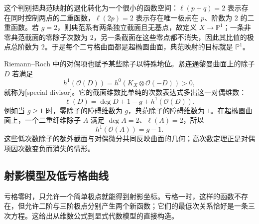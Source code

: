 这个判别把典范映射的退化转化为一个很小的函数空间：\(\ell(p+q)=2\) 表示存在同时控制两点的二重函数，\(\ell(2p)=2\) 表示存在唯一极点在 \(p\)、阶数为 \(2\) 的二重函数。若 \(g=2\)，则典范系有两条独立截面且无基点，故定义 \(X\to\mathbb P^1\)；一条非零典范截面的零除子次数为 \(2\)，另一条截面在这些零点都不消失，因此其比值的极点总阶数为 \(2\)。于是每个二亏格曲面都是超椭圆曲面，典范映射的目标就是 \(\mathbb P^1\)。

\ProseParagraphBreak

Riemann--Roch 中的对偶项也赋予某些除子以特殊地位。紧连通黎曼曲面上的除子 \(D\) 若满足
\[
	h^1(\mathcal O(D))=h^0(K_X\otimes\mathcal O(-D))>0,
\]
就称为[special divisor]。它的截面维数比单纯的次数表达式多出这一对偶维数：
\[
	\ell(D)=\deg D+1-g+h^1(\mathcal O(D)).
\]
例如当 \(g\ge1\) 时，零除子的障碍维数为 \(g\)，典范除子的障碍维数为 \(1\)。在超椭圆曲面上，一个二重纤维除子 \(A\) 满足 \(\deg A=2\)、\(\ell(A)=2\)，所以
\[
	h^1(\mathcal O(A))=g-1.
\]
这些低次数除子的额外截面与对偶微分共同反映曲面的几何；高次数定理正是对偶项因次数变负而消失的情形。

\subsection{射影模型及低亏格曲线}
\label{g4:subsec:0305:04}

亏格零时，只允许一个简单极点就能得到射影坐标。亏格一时，这样的函数不存在，但允许二阶与三阶极点分别产生两个新函数；它们的最低次关系恰好是一条三次方程。这给出从维数公式到显式代数模型的直接构造。

